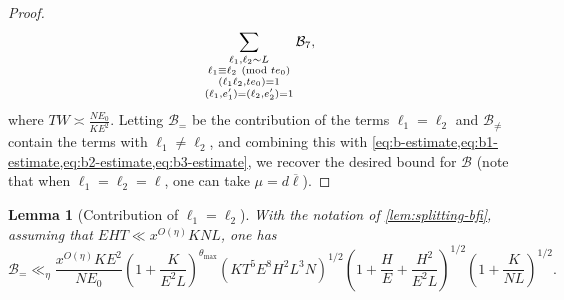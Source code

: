 \documentclass[reqno,11pt]{amsart}
\newtheorem{lemma}[theorem]{Lemma}
\theoremstyle{definition}
\theoremstyle{remark}
\numberwithin{equation}{section}
\newcommand{\mB}{\mathcal{B}}
\renewcommand{\bar}{\overline}
\renewcommand{\pmod}[1]{\ (\textnormal{mod } #1)}
\newcommand{\fix}[1]{\textcolor{myBlue}{\large (#1)\normalsize}}
\begin{document}
\begin{proof}
\[    \sum_{\substack{\ell_1, \ell_2 \sim L \\ \ell_1 \equiv \ell_2 \pmod{te_0} \\ (\ell_1 \ell_2, te_0) = 1 \\ (\ell_1, e_1') = (\ell_2, e_2') = 1}}
    \mB_7,
\]
where $TW \asymp \frac{NE_0}{KE^2}$.
Letting $\mB_=$ be the contribution of the terms $\ell_1 = \ell_2$ and $\mB_{\neq}$ contain the terms with $\ell_1 \neq \ell_2$, and combining this with \cref{eq:b-estimate,eq:b1-estimate,eq:b2-estimate,eq:b3-estimate}, we recover the desired bound for $\mB$ (note that when $\ell_1 = \ell_2 = \ell$, one can take $\mu = d\bar{\ell}$).
\end{proof}


\begin{lemma}[Contribution of $\ell_1 = \ell_2$] \label{lem:split-bfi-eq}
With the notation of \cref{lem:splitting-bfi}, assuming that $EHT \ll x^{O(\eta)} KNL$, one has
\[
    \mB_= \ll_\eta %
    \frac{x^{O(\eta)} K E^2}{NE_0}
    \left(1 + \frac{K}{E^2L}\right)^{\theta_{\max}}
    \left(KT^5E^8H^2L^3 N\right)^{1/2}
    \left(1 + \frac{H}{E} + \frac{H^2}{E^2L}\right)^{1/2} \left(1 + \frac{K}{NL} \right)^{1/2}.
\]
\end{lemma}
\end{document}
